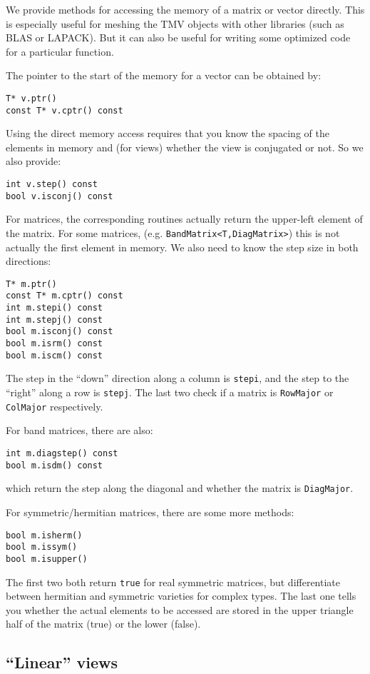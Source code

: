 \documentclass[twoside,letterpaper,11pt]{article}
\renewcommand{\tt}[1]{{\texttt {#1}}}
\begin{document}
We provide methods for accessing the memory of a matrix or vector directly.
This is especially useful for meshing the TMV objects with other libraries
(such as BLAS or LAPACK).  But it can also be useful for writing some
optimized code for a particular function.  

The pointer to the start of the memory for a vector can be obtained by:
\begin{verbatim}
T* v.ptr()
const T* v.cptr() const
\end{verbatim}

Using the direct memory access
requires that you know the spacing of the elements in memory and
(for views) whether the view is conjugated or not.  So we also provide:
\begin{verbatim}
int v.step() const
bool v.isconj() const
\end{verbatim}

For matrices, the corresponding routines actually return the upper-left element
of the matrix.  For some matrices, (e.g. \tt{BandMatrix<T,DiagMatrix>}) 
this is not actually the first element in memory.  We also need to know the 
step size in both directions:
\begin{verbatim}
T* m.ptr()
const T* m.cptr() const
int m.stepi() const
int m.stepj() const
bool m.isconj() const
bool m.isrm() const
bool m.iscm() const
\end{verbatim}
The step in the ``down'' direction along a column is \tt{stepi}, and the step to 
the ``right'' along a row is \tt{stepj}.
The last two check if a matrix is \tt{RowMajor} or \tt{ColMajor} respectively.

For band matrices, there are also:
\begin{verbatim}
int m.diagstep() const
bool m.isdm() const
\end{verbatim}
which return the step along the diagonal and whether the matrix is \tt{DiagMajor}.

For symmetric/hermitian matrices, there are some more methods:
\begin{verbatim}
bool m.isherm()
bool m.issym()
bool m.isupper()
\end{verbatim}
The first two both return \tt{true} for real symmetric matrices, but 
differentiate between hermitian and symmetric varieties for complex types.
The last one tells you whether the actual elements to be accessed are stored
in the upper triangle half of the matrix (true) or the lower (false).

\subsection{``Linear'' views}
\end{document}

